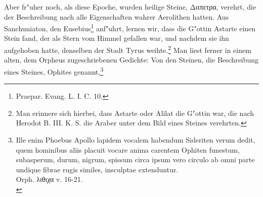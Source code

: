 \documentclass[a4paper, 11pt, oneside, polutonikogreek, german]{article}
\begin{document}
Aber fr"uher noch, als diese Epoche, wurden heilige Steine, Διιπετρα, verehrt, die der Beschreibung nach alle Eigenschaften wahrer Aerolithen hatten. Aus Sanchuniaton, den Eusebius\footnote{Praepar. Evang. L. I. C. 10.} anf"uhrt, lernen wir, dass die G"ottin Astarte einen Stein fand, der als Stern vom Himmel gefallen war, und nachdem sie ihn aufgehoben hatte, denselben der Stadt Tyrus weihte.\footnote{Man erinnere sich hierbei, dass Astarte oder Alilat die G"ottin war, die nach Herodot B. III. K. S. die Araber unter dem Bild eines Steines verehrten.} Man liest ferner in einem alten, dem Orpheus zugeschriebenen Gedichte: Von den Steinen, die Beschreibung eines Steines, Ophites genannt,\footnote{Ille enim Phoebus Apollo lapidem vocalem habendum Sideriten verum dedit, quem hominibus aliis placuit vocare anima carentem Ophiten funestum, subasperum, durum, nigrum, spissum circa ipsum vero circulo ab omni parte undique fibrae rugis similes, insculptae extenduntur.\\
Orph. λιθιχα v. 16-21.\\
}
\end{document}
